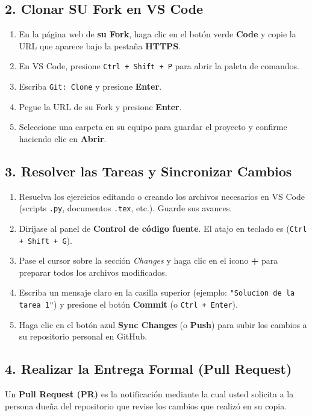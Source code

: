 \documentclass[12pt]{article}
\begin{document}
\subsection*{2. Clonar SU Fork en VS Code}
\begin{enumerate}[label=\arabic*)]
    \item En la página web de \textbf{su Fork}, haga clic en el botón verde \textbf{Code} y copie la URL que aparece bajo la pestaña \textbf{HTTPS}.
    \item En VS Code, presione \lstinline|Ctrl + Shift + P| para abrir la paleta de comandos.
    \item Escriba \lstinline|Git: Clone| y presione \textbf{Enter}.
    \item Pegue la URL de su Fork y presione \textbf{Enter}.
    \item Seleccione una carpeta en su equipo para guardar el proyecto y confirme haciendo clic en \textbf{Abrir}.
\end{enumerate}

\subsection*{3. Resolver las Tareas y Sincronizar Cambios}
\begin{enumerate}[label=\arabic*)]
    \item Resuelva los ejercicios editando o creando los archivos necesarios en VS Code 
    (scripts \lstinline|.py|, documentos \lstinline|.tex|, etc.). Guarde sus avances.
    \item Diríjase al panel de \textbf{Control de código fuente}. El atajo en teclado es 
    (\lstinline|Ctrl + Shift + G|).
    \item Pase el cursor sobre la sección \emph{Changes} y haga clic en el icono \textbf{+} para preparar todos los archivos modificados.
    \item Escriba un mensaje claro en la casilla superior 
    (ejemplo: \lstinline|"Solucion de la tarea 1"|) y presione el botón \textbf{Commit} (o \lstinline|Ctrl + Enter|).
    \item Haga clic en el botón azul \textbf{Sync Changes} (o \textbf{Push}) para subir los cambios a su repositorio personal en GitHub.
\end{enumerate}

\subsection*{4. Realizar la Entrega Formal (Pull Request)}
Un \textbf{Pull Request (PR)} es la notificación mediante la cual usted solicita 
a la persona dueña del repositorio que revise los cambios que realizó en su copia.
\end{document}
